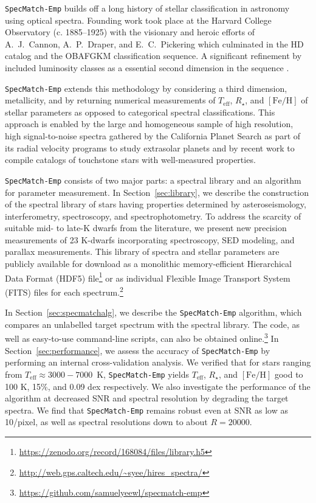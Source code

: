 \documentclass[preprint2]{aastex6}
\newcommand{\SpecMatch}{\texttt{SpecMatch-Emp}\xspace}
\newcommand{\Rstar}{\ensuremath{R_{\star}}\xspace}
\newcommand{\fe}{\ensuremath{\mathrm{[Fe/H]}}\xspace}
\newcommand{\teff}{\ensuremath{T_{\mathrm{eff}}}\xspace}
\newcommand{\kdwarfnum}{23\xspace}
\newcommand{\libtefflo}{3000\xspace}
\newcommand{\libteffhi}{7000\xspace}
\newcommand{\sigteff}{100 K\xspace}
\newcommand{\sigRstar}{15\%\xspace}
\newcommand{\sigfe}{0.09 dex\xspace}
\begin{document}
\SpecMatch builds off a long history of stellar classification in astronomy using optical spectra. Founding work took place at the Harvard College Observatory (c. 1885--1925) with the visionary and heroic efforts of A.~J.~Cannon, A.~P.~Draper, and E.~C.~Pickering which culminated in the HD catalog and the OBAFGKM classification sequence. A significant refinement by \cite{Morgan43} included luminosity classes as a essential second dimension in the sequence \citep{Gray09}.

\SpecMatch extends this methodology by considering a third dimension, metallicity, and by returning numerical measurements of \teff, \Rstar, and \fe of stellar parameters as opposed to categorical spectral classifications. This approach is enabled by the large and homogeneous sample of high resolution, high signal-to-noise spectra gathered by the California Planet Search as part of its radial velocity programs to study extrasolar planets and by recent work to compile catalogs of touchstone stars with well-measured properties.

\SpecMatch consists of two major parts: a spectral library and an algorithm for parameter measurement. In Section~\ref{sec:library}, we describe the construction of the spectral library of stars having properties determined by asteroseismology, interferometry, spectroscopy, and spectrophotometry. To address the scarcity of suitable mid- to late-K dwarfs from the literature, we present new precision measurements of \kdwarfnum K-dwarfs incorporating spectroscopy, SED modeling, and parallax measurements. This library of spectra and stellar parameters are publicly available for download as a monolithic memory-efficient Hierarchical Data Format (HDF5) file\footnote{\url{https://zenodo.org/record/168084/files/library.h5}} or as individual Flexible Image Transport System (FITS) files for each spectrum.\footnote{\url{http://web.gps.caltech.edu/\~syee/hires_spectra/}}

In Section~\ref{sec:specmatchalg}, we describe the \SpecMatch algorithm, which compares an unlabelled target spectrum with the spectral library. The code, as well as easy-to-use command-line scripts, can also be obtained online.\footnote{\url{https://github.com/samuelyeewl/specmatch-emp}} In Section~\ref{sec:performance}, we assess the accuracy of \SpecMatch by performing an internal cross-validation analysis. We verified that for stars ranging from $\teff\approx\libtefflo- \libteffhi$~K, \SpecMatch yields \teff, \Rstar, and \fe good to \sigteff, \sigRstar, and \sigfe respectively. We also investigate the performance of the algorithm at decreased SNR and spectral resolution by degrading the target spectra. We find that \SpecMatch remains robust even at SNR as low as 10/pixel, as well as spectral resolutions down to about $R = 20000$.
\end{document}
